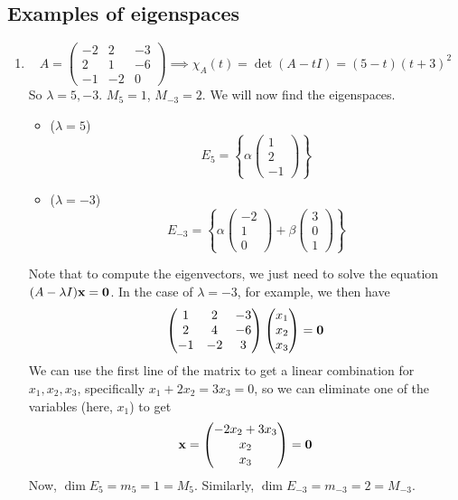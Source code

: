 \subsection{Examples of eigenspaces}
\begin{enumerate}
	\item
	      \[
		      A = \begin{pmatrix}
			      -2 & 2 & -3 \\ 2 & 1 & -6 \\ -1 & -2 & 0
		      \end{pmatrix} \implies \chi_A(t) = \det(A - tI) = (5-t)(t+3)^2
	      \]
	      So \(\lambda = 5, -3\).
	      \(M_5 = 1\), \(M_{-3} = 2\).
	      We will now find the eigenspaces.
	      \begin{itemize}
		      \item (\(\lambda = 5\))
		            \[
			            E_5 = \left\{ \alpha\begin{pmatrix}
				            1 \\ 2 \\ -1
			            \end{pmatrix} \right\}
		            \]
		      \item (\(\lambda = -3\))
		            \[
			            E_{-3} = \left\{ \alpha\begin{pmatrix}
				            -2 \\ 1 \\ 0
			            \end{pmatrix} + \beta\begin{pmatrix}
				            3 \\ 0 \\ 1
			            \end{pmatrix} \right\}
		            \]
	      \end{itemize}
	      Note that to compute the eigenvectors, we just need to solve the equation \((A - \lambda I)\vb x = \vb 0\).
	      In the case of \(\lambda = -3\), for example, we then have
	      \[
		      \begin{pmatrix}
			      1 & 2 & -3 \\ 2 & 4 & -6 \\ -1 & -2 & 3
		      \end{pmatrix} \begin{pmatrix}
			      x_1 \\ x_2 \\ x_3
		      \end{pmatrix} = \vb 0
	      \]
	      We can use the first line of the matrix to get a linear combination for \(x_1, x_2, x_3\), specifically \(x_1 + 2x_2 = 3x_3 = 0\), so we can eliminate one of the variables (here, \(x_1\)) to get
	      \[
		      \vb x = \begin{pmatrix}
			      -2x_2 + 3x_3 \\ x_2 \\ x_3
		      \end{pmatrix} = \vb 0
	      \]
	      Now, \(\dim E_5 = m_5 = 1 = M_5\).
	      Similarly, \(\dim E_{-3} = m_{-3} = 2 = M_{-3}\).


\end{enumerate}
